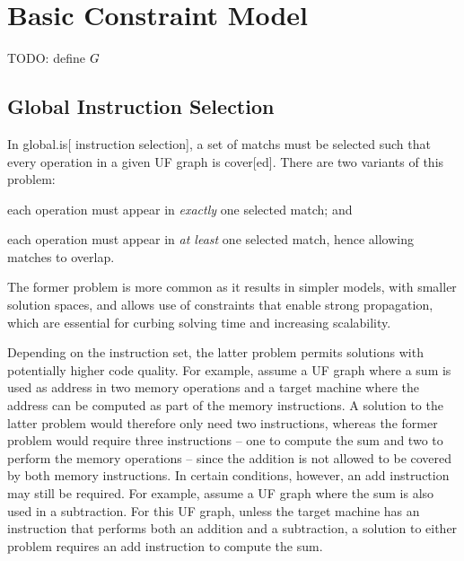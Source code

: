 %

\chapter{Basic Constraint Model}

TODO: define $G$

\section{Global Instruction Selection}

In \gls{global.is}[ \gls{instruction selection}], a set of \glspl{match} must be
selected such that every \gls{operation} in a given \gls{UF graph} is
\gls{cover}[ed].
%
There are two variants of this problem:
%
\begin{enumerateinline}
  \item each \gls{operation} must appear in \emph{exactly} one selected
    \gls{match}; and
%
  \item each \gls{operation} must appear in \emph{at least} one selected
    \gls{match}, hence allowing matches to \gls{overlap}.
\end{enumerateinline}
%
The former problem is more common as it results in simpler models, with smaller
\glspl{solution space}, and allows use of \glspl{constraint} that enable strong
\gls{propagation}, which are essential for curbing solving time and increasing
scalability.

Depending on the \gls{instruction set}, the latter problem permits
\glspl{solution} with potentially higher code quality.
%
For example, assume a \gls{UF graph} where a sum is used as address in two
memory operations and a \gls{target machine} where the address can be computed
as part of the memory instructions.
%
A \gls{solution} to the latter problem would therefore only need two
instructions, whereas the former problem would require three instructions -- one
to compute the sum and two to perform the memory operations -- since the
addition is not allowed to be covered by both memory instructions.
%
In certain conditions, however, an add instruction may still be required.
%
For example, assume a \gls{UF graph} where the sum is also used in a
subtraction.
%
For this \gls{UF graph}, unless the \gls{target machine} has an instruction that
performs both an addition and a subtraction, a \gls{solution} to either problem
requires an add instruction to compute the sum.

